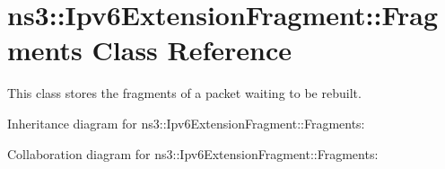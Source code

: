 \hypertarget{classns3_1_1Ipv6ExtensionFragment_1_1Fragments}{}\section{ns3\+:\+:Ipv6\+Extension\+Fragment\+:\+:Fragments Class Reference}
\label{classns3_1_1Ipv6ExtensionFragment_1_1Fragments}


This class stores the fragments of a packet waiting to be rebuilt.  




Inheritance diagram for ns3\+:\+:Ipv6\+Extension\+Fragment\+:\+:Fragments\+:


Collaboration diagram for ns3\+:\+:Ipv6\+Extension\+Fragment\+:\+:Fragments\+:
